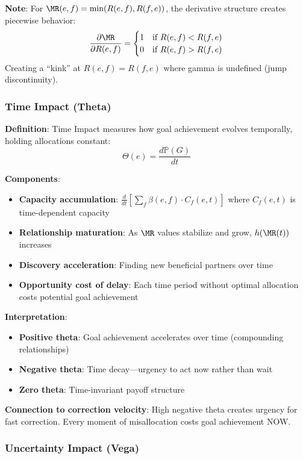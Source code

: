 \textbf{Note}: For $\MR(e,f) = \min(R(e,f), R(f,e))$, the derivative structure creates piecewise behavior:
\[ \frac{\partial \MR}{\partial R(e,f)} = \begin{cases} 1 & \text{if } R(e,f) < R(f,e) \\ 0 & \text{if } R(e,f) > R(f,e) \end{cases} \]
Creating a ``kink'' at $R(e,f) = R(f,e)$ where gamma is undefined (jump discontinuity).

\subsubsection{Time Impact (Theta)}

\textbf{Definition}: Time Impact measures how goal achievement evolves temporally, holding allocations constant:
\[ \Theta(e) = \frac{d\mathbb{P}(G)}{dt} \]

\textbf{Components}:
\begin{itemize}
\item \textbf{Capacity accumulation}: $\frac{d}{dt}\left[\sum_f \beta(e,f) \cdot C_f(e,t)\right]$ where $C_f(e,t)$ is time-dependent capacity
\item \textbf{Relationship maturation}: As $\MR$ values stabilize and grow, $h(\MR(t))$ increases
\item \textbf{Discovery acceleration}: Finding new beneficial partners over time
\item \textbf{Opportunity cost of delay}: Each time period without optimal allocation costs potential goal achievement
\end{itemize}

\textbf{Interpretation}:
\begin{itemize}
\item \textbf{Positive theta}: Goal achievement accelerates over time (compounding relationships)
\item \textbf{Negative theta}: Time decay---urgency to act now rather than wait
\item \textbf{Zero theta}: Time-invariant payoff structure
\end{itemize}

\textbf{Connection to correction velocity}: High negative theta creates urgency for fast correction. Every moment of misallocation costs goal achievement NOW.

\subsubsection{Uncertainty Impact (Vega)}

